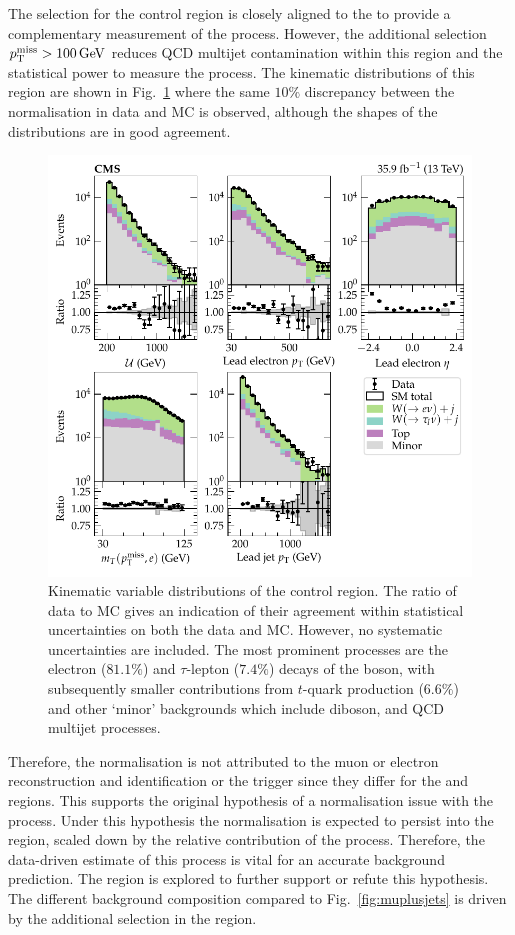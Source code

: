 The selection for the \eleplusjets control region is closely aligned to the \muplusjets to provide a complementary measurement of the \IWlvj process. However, the additional selection ${p_{\text{T}}^{\mathrm{miss}}>\SI{100}{GeV}}$ reduces QCD multijet contamination within this region and the statistical power to measure the \IWlvj process. The kinematic distributions of this region are shown in Fig.~\ref{fig:eleplusjets} where the same $10\%$ discrepancy between the normalisation in data and MC is observed, although the shapes of the distributions are in good agreement.
%
\begin{figure}[htb]
    \centering
    \includegraphics{chapters/042_backgrounds/images/singleele_dists.pdf}
    \caption[Single electron final state kinematics.]{
        Kinematic variable distributions of the \eleplusjets control region. The ratio of data to MC gives an indication of their agreement within statistical uncertainties on both the data and MC. However, no systematic uncertainties are included. The most prominent processes are the electron ($81.1\%$) and $\tau$-lepton ($7.4\%$) decays of the \PW boson, with subsequently smaller contributions from $t$-quark production ($6.6\%$) and other `minor' backgrounds which include diboson, \IDYee and QCD multijet processes.
    }
    \label{fig:eleplusjets}
\end{figure}
%
Therefore, the normalisation is not attributed to the muon or electron reconstruction and identification or the trigger since they differ for the \muplusjets and \eleplusjets regions. This supports the original hypothesis of a normalisation issue with the \IWj process. Under this hypothesis the normalisation is expected to persist into the \metplusjets region, scaled down by the relative contribution of the \IWj process. Therefore, the data-driven estimate of this process is vital for an accurate background prediction. The \tauplusjets region is explored to further support or refute this hypothesis. The different background composition compared to Fig.~\ref{fig:muplusjets} is driven by the additional \ptmiss selection in the \eleplusjets region.


